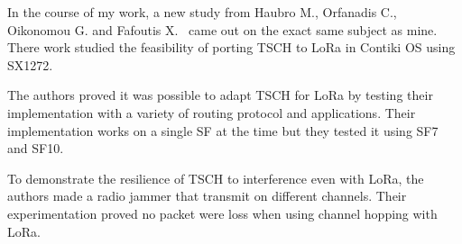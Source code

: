 In the course of my work, a new study from Haubro M., Orfanadis C.,
Oikonomou G. and Fafoutis X.~\cite{tschoverlora} came out on the exact 
same subject as mine. There work studied the feasibility of porting 
TSCH to LoRa in Contiki OS using SX1272.

The authors proved it was possible to adapt TSCH for LoRa by testing their
implementation with a variety of routing protocol and applications.
Their implementation works on a single SF at the time but they tested it using
SF7 and SF10.

To demonstrate the resilience of TSCH to interference even with LoRa, the
authors made a radio jammer that transmit on different channels. Their
experimentation proved no packet were loss when using channel hopping with
LoRa.
